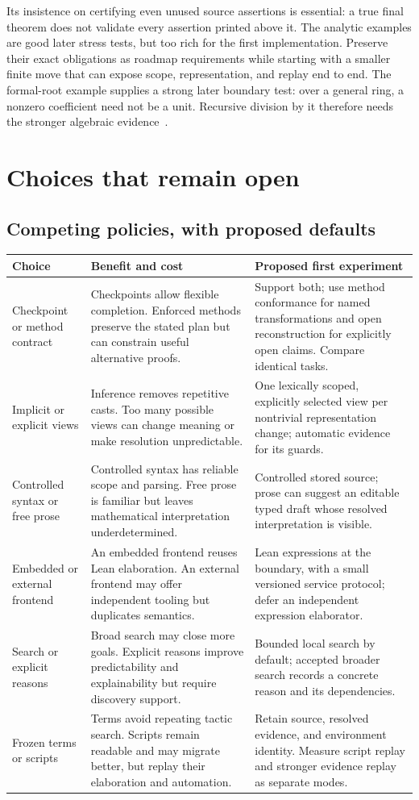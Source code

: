 \documentclass[11pt,letterpaper]{article}
\begin{document}
Its insistence on certifying even unused source assertions is essential: a true
final theorem does not validate every assertion printed above it. The analytic
examples are good later stress tests, but too rich for the first implementation.
Preserve their exact obligations as roadmap requirements while starting with a
smaller finite move that can expose scope, representation, and replay end to end.
The formal-root example supplies a strong later boundary test: over a general ring,
a nonzero coefficient need not be a unit. Recursive division by it therefore needs
the stronger algebraic evidence~\cite[\S2.6]{spine}.

\section{Choices that remain open}\label{sec:choices}
\subsection{Competing policies, with proposed defaults}
\begin{longtable}{@{}P{.19\textwidth}P{.34\textwidth}P{.39\textwidth}@{}}
\toprule
Choice & Benefit and cost & Proposed first experiment \\
\midrule
\endhead
Checkpoint or method contract & Checkpoints allow flexible completion. Enforced
  methods preserve the stated plan but can constrain useful alternative proofs.
  & Support both; use method conformance for named transformations and open
  reconstruction for explicitly open claims. Compare identical tasks.\\
Implicit or explicit views & Inference removes repetitive casts. Too many possible
  views can change meaning or make resolution unpredictable.
  & One lexically scoped, explicitly selected view per nontrivial representation
  change; automatic evidence for its guards.\\
Controlled syntax or free prose & Controlled syntax has reliable scope and parsing.
  Free prose is familiar but leaves mathematical interpretation underdetermined.
  & Controlled stored source; prose can suggest an editable typed draft whose
  resolved interpretation is visible.\\
Embedded or external frontend & An embedded frontend reuses Lean elaboration.
  An external frontend may offer independent tooling but duplicates semantics.
  & Lean expressions at the boundary, with a small versioned service protocol;
  defer an independent expression elaborator.\\
Search or explicit reasons & Broad search may close more goals. Explicit reasons
  improve predictability and explainability but require discovery support.
  & Bounded local search by default; accepted broader search records a concrete
  reason and its dependencies.\\
Frozen terms or scripts & Terms avoid repeating tactic search. Scripts remain
  readable and may migrate better, but replay their elaboration and automation.
  & Retain source, resolved evidence, and environment identity. Measure script
  replay and stronger evidence replay as separate modes.\\
\bottomrule
\end{longtable}
\end{document}
